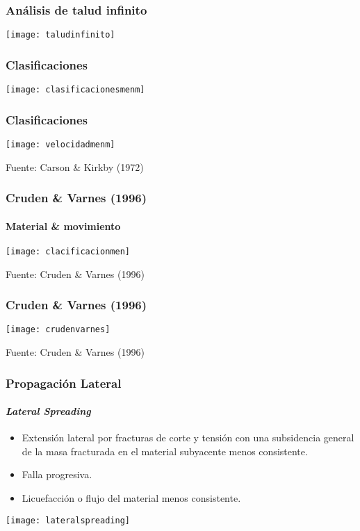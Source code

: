 \documentclass{beamer}
\begin{document}
\begin{frame}
\frametitle{Análisis de talud infinito}
\begin{center}
   	\texttt{[image: taludinfinito]} 
\end{center}
\end{frame}
\begin{frame}
\frametitle{Clasificaciones}
\begin{center}
   	\texttt{[image: clasificacionesmenm]} 
\end{center}
\end{frame}
\begin{frame}
\frametitle{Clasificaciones}
\begin{center}
   	\texttt{[image: velocidadmenm]} 
\end{center}
\tiny{Fuente: Carson \& Kirkby (1972)}
\end{frame}
\begin{frame}
\frametitle{Cruden \& Varnes (1996)}
\framesubtitle{Material \& movimiento}
\begin{center}
   	\texttt{[image: clacificacionmen]} 
\end{center}
\tiny{Fuente: Cruden \& Varnes (1996)}
\end{frame}
\begin{frame}
\frametitle{Cruden \& Varnes (1996)}
\begin{center}
   	\texttt{[image: crudenvarnes]} 
\end{center}
\tiny{Fuente: Cruden \& Varnes (1996)}
\end{frame}
\begin{frame}
\frametitle{Propagación Lateral}
\framesubtitle{\it{Lateral Spreading}}
\begin{itemize}
\item Extensión lateral por fracturas de corte y tensión con una subsidencia general de la masa fracturada en el material subyacente menos consistente.
\item Falla progresiva.
\item Licuefacción o flujo del material menos consistente.
\end{itemize}
\begin{center}
   	\texttt{[image: lateralspreading]} 
\end{center}
\end{frame}
\end{document}

